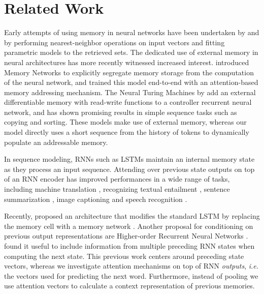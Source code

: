 \documentclass{article}
\newcommand{\ie}{{\emph{i.e.}}}
\begin{document}
\section{Related Work}

Early attempts of using memory in neural networks have been undertaken by \cite{taylor1959pattern} and \cite{steinbuch1963learning} by performing nearest-neighbor operations on input vectors and fitting
parametric models to the retrieved sets. 
The dedicated use of external memory in neural architectures has more recently witnessed increased interest. 
\cite{weston2014memory} introduced Memory Networks to explicitly segregate memory storage from the computation of the neural network, and \cite{SUK15} trained this model end-to-end with an attention-based memory addressing mechanism.
The Neural Turing Machines by \cite{graves2014neural} add an external differentiable memory with read-write functions to a controller recurrent neural network, and has shown promising results in simple sequence tasks such as copying and sorting. 
These models make use of external memory, whereas our model directly uses a short sequence from the history of tokens to dynamically populate an addressable memory.


In sequence modeling, RNNs such as LSTMs \citep{HOC97} maintain an internal memory state as they process an input sequence.
Attending over previous state outputs on top of an RNN encoder has improved performances in a wide range of tasks, including machine translation \citep{bahdanau2014neural}, recognizing textual entailment \citep{rocktaschel2015reasoning}, sentence summarization \citep{rush2015attention}, image captioning \citep{xu2015show} and speech recognition \citep{chorowski2015attention}. 

Recently, \cite{cheng2016long} proposed an architecture that modifies the standard LSTM by replacing the memory cell with a memory network \citep{weston2014memory}.
Another proposal for conditioning on previous output representations are Higher-order Recurrent Neural Networks \citep[HORNNs,][]{soltani2016higher}.
\citeauthor{soltani2016higher} found it useful to include information from multiple preceding RNN states when computing the next state. 
This previous work centers around preceding state vectors, whereas we investigate attention mechanisms on top of RNN \emph{outputs}, \ie{} the vectors used for predicting the next word. 
Furthermore, instead of pooling we use attention vectors to calculate a context representation of previous memories.
\end{document}
